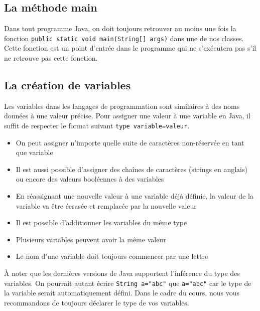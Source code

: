 \subsection{La méthode main}
Dans tout programme Java, on doit toujours retrouver au moins une fois la fonction \lstinline{public static void main(String[] args)} dans une de nos classes. Cette fonction est un point d'entrée dans le programme qui ne s'exécutera pas s'il ne retrouve pas cette fonction.

\subsection{La création de variables}

Les variables dans les langages de programmation sont similaires à des noms données à une valeur précise.
Pour assigner une valeur à une variable en Java, il suffit de respecter le format suivant \lstinline{type variable=valeur}.


\begin{conseil}
\begin{itemize}
	\item On peut assigner n'importe quelle suite de caractères non-réservée en tant que variable
	\item Il est aussi possible d'assigner des chaînes de caractères (strings en anglais) ou encore des valeurs booléennes à des variables
	\item En réassignant une nouvelle valeur à une variable déjà définie, la valeur de la variable va être écrasée et remplacée par la nouvelle valeur
	\item Il est possible d'additionner les variables du même type
	\item Plusieurs variables peuvent avoir la même valeur
	\item Le nom d'une variable doit toujours commencer par une lettre
\end{itemize}

\end{conseil}
À noter que les dernières versions de Java supportent l'inférence du type des variables. On pourrait autant écrire \lstinline{String a="abc"} que \lstinline{a="abc"} car le type de la variable serait automatiquement défini. 
Dans le cadre du cours, nous vous recommandons de toujours déclarer le type de vos variables.

